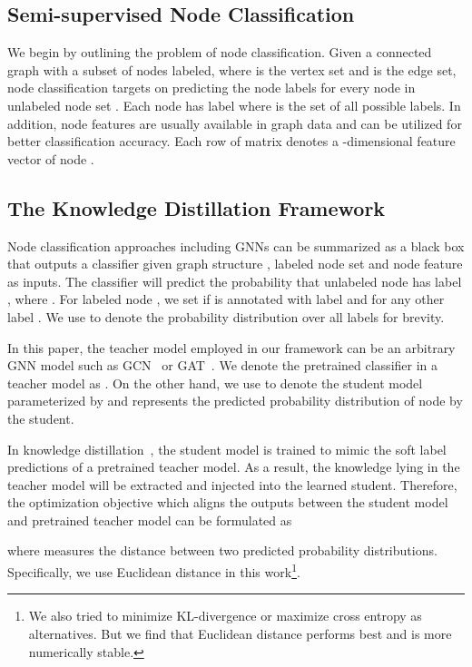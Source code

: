 \documentclass[sigconf]{acmart}
\begin{document}
\subsection{Semi-supervised Node Classification}
We begin by outlining the problem of node classification. Given a connected graph  with a subset of nodes  labeled, where  is the vertex set and  is the edge set, node classification targets on predicting the node labels for every node  in unlabeled node set . Each node  has label  where  is the set of all possible labels. In addition, node features  are usually available in graph data and can be utilized for better classification accuracy. Each row  of matrix  denotes a -dimensional feature vector of node .
\subsection{The Knowledge Distillation Framework}
Node classification approaches including GNNs can be summarized as a black box that outputs a classifier  given graph structure , labeled node set  and node feature  as inputs. The classifier  will predict the probability  that unlabeled node  has label , where . For labeled node , we set  if  is annotated with label  and  for any other label . We use  to denote the probability distribution over all labels for brevity.

In this paper, the teacher model employed in our framework can be an arbitrary GNN model such as GCN~\cite{kipf2016semi} or GAT~\cite{velivckovic2018graph}. We denote the pretrained classifier in a teacher model as . On the other hand, we use  to denote the student model parameterized by  and  represents the predicted probability distribution of node  by the student.

In knowledge distillation~\cite{hinton2015distilling}, the student model is trained to mimic the soft label predictions of a pretrained teacher model. As a result, the knowledge lying in the teacher model will be extracted and injected into the learned student. Therefore, the optimization objective which aligns the outputs between the student model and pretrained teacher model can be formulated as

where  measures the distance between two predicted probability distributions. Specifically, we use Euclidean distance in this work\footnote{We also tried to minimize KL-divergence or maximize cross entropy as alternatives. But we find that Euclidean distance performs best and is more numerically stable.}.
\end{document}
